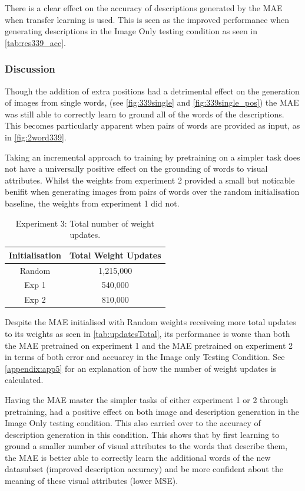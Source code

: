 There is a clear effect on the accuracy of descriptions generated by the \ac{MAE} when transfer learning is used. This is seen as the improved performance when generating descriptions in the Image Only testing condition as seen in \autoref{tab:res339_acc}.


\subsubsection{Discussion}
Though the addition of extra positions had a detrimental effect on the generation of images from single words, (see \autoref{fig:339single} and \autoref{fig:339single_pos}) the \ac{MAE} was still able to correctly learn to ground all of the words of the descriptions. This becomes particularly apparent when pairs of words are provided as input, as in \autoref{fig:2word339}.

Taking an incremental approach to training by pretraining on a simpler task does not have a universally positive effect on the grounding of words to visual attributes. Whilst the weights from experiment 2 provided a small but noticable benifit when generating images from pairs of words over the random initialisation baseline, the weights from experiment 1 did not. 

\begin{table}
\centering
\begin{tabular}{|c|c|}
\hline
\textbf{Initialisation} & \textbf{Total Weight Updates}\\ \hline
Random &  1,215,000\\ \hline
Exp 1 &  540,000\\ \hline
Exp 2 &  810,000\\ \hline

\end{tabular}
\caption{Experiment 3: Total number of weight updates.}
\label{tab:updatesTotal}
\end{table}

Despite the \ac{MAE} initialised with Random weights receiveing more total updates to its weights as seen in \autoref{tab:updatesTotal}, its performance is worse than both the \ac{MAE} pretrained on experiment 1 and the MAE pretrained on experiment 2 in terms of both error and accuarcy in the Image only Testing Condition. See \autoref{appendix:app5} for an explanation of how the number of weight updates is calculated.

Having the \ac{MAE} master the simpler tasks of either experiment 1 or 2 through pretraining, had a positive effect on both image and description generation in the Image Only testing condition. This also carried over to the accuracy of description generation in this condition. This shows that by first learning to ground a smaller number of visual attributes to the words that describe them, the \ac{MAE} is better able to correctly learn the additional words of the new datasubset (improved description accuracy) and be more confident about the meaning of these visual attributes (lower \ac{MSE}).


